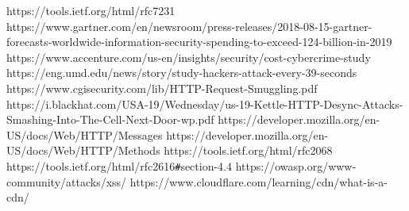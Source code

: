 \documentclass[
fontsize=11pt,
paper=a4,
abstract=true,
numbers=noenddot,
listof=totoc,
bibliography=totoc,
oneside,
cleardoublepage=plain,
parskip=half+, %
BCOR=1cm, %
]{scrreprt}
\begin{document}
















\begin{thebibliography}{00}
	 https://tools.ietf.org/html/rfc7231 
	 https://www.gartner.com/en/newsroom/press-releases/2018-08-15-gartner-forecasts-worldwide-information-security-spending-to-exceed-124-billion-in-2019
	 https://www.accenture.com/us-en/insights/security/cost-cybercrime-study
	 https://eng.umd.edu/news/story/study-hackers-attack-every-39-seconds
	 https://www.cgisecurity.com/lib/HTTP-Request-Smuggling.pdf
	 https://i.blackhat.com/USA-19/Wednesday/us-19-Kettle-HTTP-Desync-Attacks-Smashing-Into-The-Cell-Next-Door-wp.pdf
	 https://developer.mozilla.org/en-US/docs/Web/HTTP/Messages
	 https://developer.mozilla.org/en-US/docs/Web/HTTP/Methods
	 https://tools.ietf.org/html/rfc2068
	 https://tools.ietf.org/html/rfc2616\verb|#|section-4.4
	 https://owasp.org/www-community/attacks/xss/
	 https://www.cloudflare.com/learning/cdn/what-is-a-cdn/
	
\end{thebibliography}	
\end{document}
